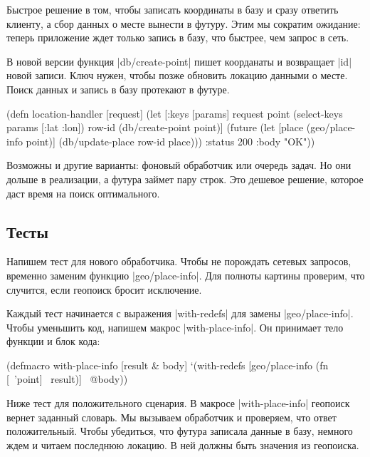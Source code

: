 Быстрое решение в том, чтобы записать координаты в базу и сразу ответить
клиенту, а сбор данных о месте вынести в футуру. Этим мы сократим ожидание:
теперь приложение ждет только запись в базу, что быстрее, чем запрос в сеть.

В новой версии функция \spverb|db/create-point| пишет коорданаты и возвращает
\spverb|id| новой записи. Ключ нужен, чтобы позже обновить локацию данными о
месте. Поиск данных и запись в базу протекают в футуре.

\begin{english}
  \begin{clojure}
(defn location-handler
  [request]
  (let [{:keys [params]} request
        point (select-keys params [:lat :lon])
        row-id (db/create-point point)]
    (future
      (let [place (geo/place-info point)]
        (db/update-place row-id place)))
    {:status 200 :body "OK"}))
  \end{clojure}
\end{english}

Возможны и другие варианты: фоновый обработчик или очередь задач. Но они дольше
в реализации, а футура займет пару строк. Это дешевое решение, которое даст
время на поиск оптимального.

\subsection{Тесты}

Напишем тест для нового обработчика. Чтобы не порождать сетевых запросов,
временно заменим функцию \spverb|geo/place-info|. Для полноты картины проверим,
что случится, если геопоиск бросит исключение.

Каждый тест начинается с выражения \spverb|with-redefs| для замены
\spverb|geo/place-info|. Чтобы уменьшить код, напишем макрос
\spverb|with-place-info|. Он принимает тело функции и блок кода:

\begin{english}
  \begin{clojure}
(defmacro with-place-info
  [result & body]
  `(with-redefs [geo/place-info
                 (fn [~'point] ~result)]
     ~@body))
  \end{clojure}
\end{english}

Ниже тест для положительного сценария. В макросе \spverb|with-place-info|
геопоиск вернет заданный словарь. Мы вызываем обработчик и проверяем, что ответ
положительный. Чтобы убедиться, что футура записала данные в базу, немного ждем
и читаем последнюю локацию. В ней должны быть значения из геопоиска.

